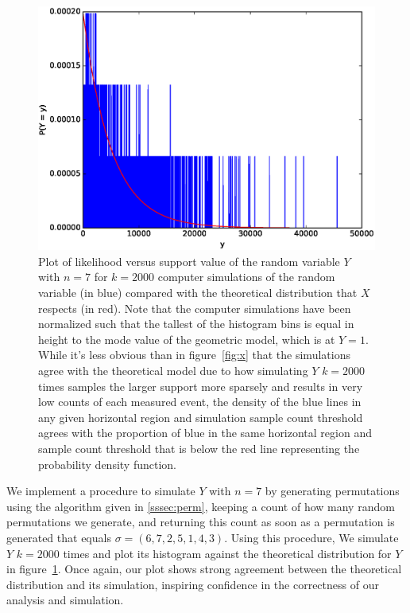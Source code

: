\documentclass[11pt, oneside]{article}   	%
\begin{document}
\begin{figure}[H]
\includegraphics[scale=.5]{part_1_problem_5}
\caption{Plot of likelihood versus support value of the random variable $Y$ with $n = 7$ for $k = 2000$ computer simulations of the random variable (in blue) compared with the theoretical distribution that $X$ respects (in red). Note that the computer simulations have been normalized such that the tallest of the histogram bins is equal in height to the mode value of the geometric model, which is at $Y = 1$. While it's less obvious than in figure~\ref{fig:x} that the simulations agree with the theoretical model due to how simulating $Y$ $k = 2000$ times samples the larger support more sparsely and results in very low counts of each measured event, the density of the blue lines in any given horizontal region and simulation sample count threshold agrees with the proportion of blue in the same horizontal region and sample count threshold that is below the red line representing the probability density function.}
\label{fig:y}
\end{figure}

We implement a procedure to simulate $Y$ with $n = 7$ by generating permutations using the algorithm given in \ref{sssec:perm}, keeping a count of how many random permutations we generate, and returning this count as soon as a permutation is generated that equals $\sigma = (6, 7, 2, 5, 1, 4, 3)$. Using this procedure, We simulate $Y$ $k = 2000$ times and plot its histogram against the theoretical distribution for $Y$ in figure~\ref{fig:y}. Once again, our plot shows strong agreement between the theoretical distribution and its simulation, inspiring confidence in the correctness of our analysis and simulation.
\end{document}

